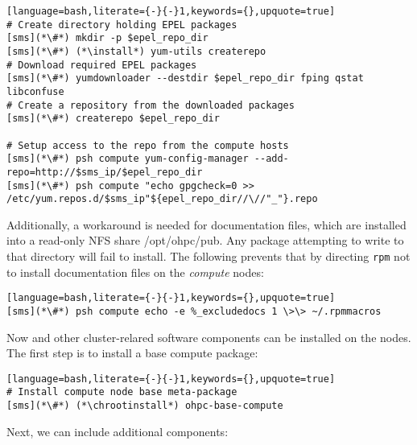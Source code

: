 \begin{lstlisting}[language=bash,literate={-}{-}1,keywords={},upquote=true]
# Create directory holding EPEL packages
[sms](*\#*) mkdir -p $epel_repo_dir
[sms](*\#*) (*\install*) yum-utils createrepo
# Download required EPEL packages
[sms](*\#*) yumdownloader --destdir $epel_repo_dir fping qstat libconfuse
# Create a repository from the downloaded packages
[sms](*\#*) createrepo $epel_repo_dir

# Setup access to the repo from the compute hosts
[sms](*\#*) psh compute yum-config-manager --add-repo=http://$sms_ip/$epel_repo_dir
[sms](*\#*) psh compute "echo gpgcheck=0 >> /etc/yum.repos.d/$sms_ip"${epel_repo_dir//\//"_"}.repo
\end{lstlisting}


\noindent Additionally, a workaround is needed for \OHPC{} documentation files,
which are installed into a read-only NFS share /opt/ohpc/pub. Any package
attempting to write to that directory will fail to install. The following
prevents that by directing \texttt{rpm} not to install documentation files on
the {\em compute} nodes: 

\begin{lstlisting}[language=bash,literate={-}{-}1,keywords={},upquote=true]
[sms](*\#*) psh compute echo -e %_excludedocs 1 \>\> ~/.rpmmacros
\end{lstlisting}

\noindent Now \OHPC{} and other cluster-relared software components can be
installed on the nodes. The first step is to install a base compute package:
\begin{lstlisting}[language=bash,literate={-}{-}1,keywords={},upquote=true]
# Install compute node base meta-package
[sms](*\#*) (*\chrootinstall*) ohpc-base-compute
\end{lstlisting}

\noindent Next, we can include additional components:
